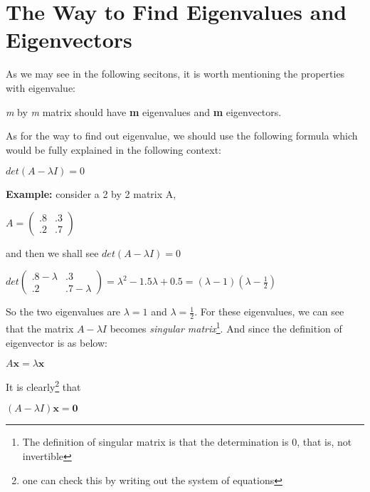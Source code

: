 \documentclass[12pt]{article}
\begin{document}
\section{The Way to Find Eigenvalues and Eigenvectors}

As we may see in the following secitons, it is worth mentioning the properties with eigenvalue:

\begin{center}
    \textit{m} by \textit{m} matrix should have \textbf{m} eigenvalues and \textbf{m} eigenvectors. 
\end{center}

As for the way to find out eigenvalue, we should use the following formula which would be fully explained in the following context:

\begin{center}
    $det(A-\lambda I) = 0$
\end{center}

\textbf{Example:} consider a 2 by 2 matrix A,
    \begin{center}
    $A=\begin{pmatrix}
        .8 & .3\\
        .2 & .7
    \end{pmatrix}$
\end{center}

and then we shall see $det(A-\lambda I) = 0$

\begin{center}
    $det\begin{pmatrix}
        .8-\lambda & .3\\
        .2 & .7-\lambda
        \end{pmatrix} = \lambda^{2}-1.5\lambda + 0.5 = (\lambda-1)(\lambda-\frac{1}{2})$
\end{center}

So the two eigenvalues are $\lambda = 1$ and $\lambda = \frac{1}{2}$.
For these eigenvalues, we can see that the matrix $A-\lambda I$ becomes \textit{singular matrix}\footnote{The definition of singular matrix is that the determination is 0, that is, not invertible}. And since the definition of eigenvector is as below:

\begin{center}
    $A \mathbf{x} = \lambda \mathbf{x}$
\end{center}

It is clearly\footnote{one can check this by writing out the system of equations} that

\begin{center}
    $(A-\lambda I)\mathbf{x} = \mathbf{0}$
\end{center}
\end{document}
